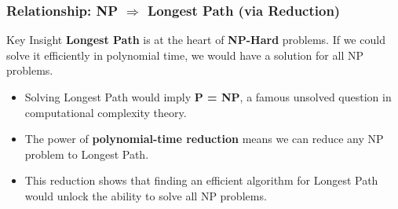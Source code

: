 \documentclass[10pt,aspectratio=43]{beamer}
\begin{document}
\begin{frame}
    \frametitle{Relationship: NP $\Rightarrow$ Longest Path (via Reduction)}

    \begin{block}{Key Insight}
        \textbf{Longest Path} is at the heart of \textbf{NP-Hard} problems. 
        If we could solve it efficiently in polynomial time, we would have a solution for all NP problems.
    \end{block}

    \vspace{0.5em}

    \begin{itemize}
        \item Solving Longest Path would imply \textbf{P = NP}, a famous unsolved question in computational complexity theory.
        \item The power of \textbf{polynomial-time reduction} means we can reduce any NP problem to Longest Path.
        \item This reduction shows that finding an efficient algorithm for Longest Path would unlock the ability to solve all NP problems.
    \end{itemize}
\end{frame}

\end{document}
